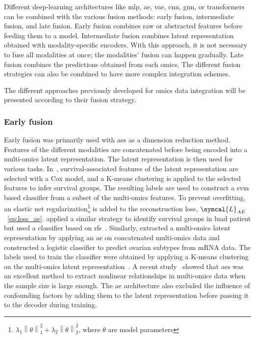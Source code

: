 \documentclass[../main.tex]{subfiles}
\begin{document}
		Different deep-learning architectures like \gls{mlp}, \gls{ae}, \gls{vae}, \gls{cnn}, \gls{gnn}, or transformers can be combined with the various fusion methods: early fusion, intermediate fusion, and late fusion.
		Early fusion combines raw or abstracted features before feeding them to a model.
		Intermediate fusion combines latent representation obtained with modality-specific encoders.
		With this approach, it is not necessary to fuse all modalities at once; the modalities' fusion can happen gradually.
		Late fusion combines the predictions obtained from each omics.
		The different fusion strategies can also be combined to have more complex integration schemes.

		The different approaches previously developed for omics data integration will be presented according to their fusion strategy.

		\subsubsection{Early fusion}
			Early fusion was primarily used with \glspl{ae} as a dimension reduction method.
			Features of the different modalities are concatenated before being encoded into a multi-omics latent representation.
			The latent representation is then used for various tasks.
			In~\cite{Chaudhary2018}, survival-associated features of the latent representation are selected with a Cox model, and a K-means clustering is applied to the selected features to infer survival groups.
			The resulting labels are used to construct a \gls{svm} based classifier from a subset of the multi-omics features.
			To prevent overfitting, an elastic net regularization\footnote{\(\lambda_{1} \left\|\theta\right\|_{1}^{2} + \lambda_{2} \left\|\theta\right\|_{2}^{2}\), where \(\theta\) are model parameters} is added to the reconstruction loss, \(\symcal{L}_{AE}\)~\cref{eq:loss_ae}.
			\citeauthor{Lee2020} applied a similar strategy to identify survival groups in \gls{luad} patient but used a classifier based on \glspl{rf}~\cite{Lee2020}.
			Similarly, \citeauthor{Guo2020} extracted a multi-omics latent representation by applying an \gls{ae} on concatenated multi-omics data and constructed a logistic classifier to predict ovarian subtypes from mRNA data.
			The labels used to train the classifier were obtained by applying a K-means clustering on the multi-omics latent representation~\cite{Guo2020}.
			A recent study~\cite{Yu2022} showed that \glspl{ae} was an excellent method to extract nonlinear relationships in multi-omics data when the sample size is large enough.
			The \gls{ae} architecture also excluded the influence of confounding factors by adding them to the latent representation before passing it to the decoder during training.
\end{document}
